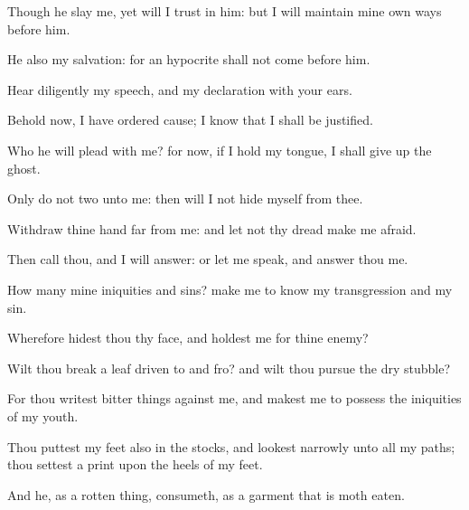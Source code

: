 {Though he
slay me, yet will I
trust in him: but I will
maintain mine own
ways
before him.

He also
{} my
salvation: for an
hypocrite shall not
come
before him.

Hear
diligently my
speech, and my
declaration with your
ears.

Behold now, I have
ordered
{}
cause; I
know that I shall be
justified.

Who
{} he
{} will
plead with me? for now, if I hold my
tongue, I shall give up the
ghost.

Only
do not
two
{} unto me: then will I not
hide myself from
thee.

Withdraw thine
hand
far from me: and let not thy
dread make me
afraid.

Then
call thou, and I will
answer: or let me
speak, and
answer thou me.


\par }{\PP {}How many
{} mine
iniquities and
sins? make me to
know my
transgression and my
sin.

Wherefore
hidest thou thy
face, and
holdest me for thine
enemy?

Wilt thou
break a
leaf driven to and
fro? and wilt thou
pursue the
dry
stubble?

For thou
writest bitter
things against me, and makest me to
possess the
iniquities of my
youth.

Thou
puttest my
feet also in the
stocks, and lookest
narrowly unto all my
paths; thou settest a
print upon the
heels of my
feet.

And he, as a rotten
thing,
consumeth, as a
garment that is
moth
eaten.




\par }
